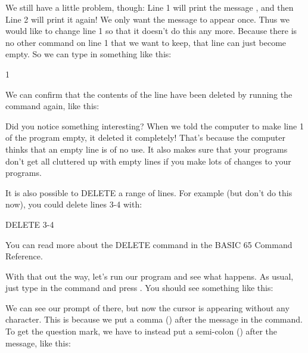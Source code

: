 
\needspace{3cm}
We still have a little problem, though: Line 1 will print the message
, and then Line 2 will print it again!
We only want the message to appear once. Thus we would like to change
line 1 so that it doesn't do this any more.  Because there is no other
command on line 1 that we want to keep, that line can just become
empty. So we can type in something like this:

\begin{screenoutput}
1
\end{screenoutput}

\needspace{4cm}
We can confirm that the contents of the line have been deleted by
running the  command again, like this:


Did you notice something interesting? When we told the computer to
make line 1 of the program empty, it deleted it completely!
That's because the computer thinks that an empty line is of no use.
It also makes sure that your programs don't get all cluttered up
with empty lines if you make lots of changes to your programs.

It is also possible to DELETE a range of lines. For example (but don't do this now), you could delete lines 3-4 with:

\begin{screenoutput}
  DELETE 3-4
\end{screenoutput}

You can read more about the DELETE command in the BASIC 65 Command Reference.

\needspace{4cm}
With that out the way, let's run our program and see what happens.
As usual, just type in the  command and press
.  You should see something like this:


\needspace{2.5cm}
We can see our prompt of  there, but
now the cursor is appearing without any  character. This is
because we put a comma (\stw{,}) after the message in the 
command.  To get the question mark, we have to instead put a
semi-colon (\stw{;}) after the message, like this:


